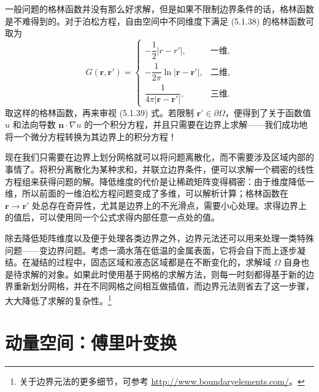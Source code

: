 一般问题的格林函数并没有那么好求解，但是如果不限制边界条件的话，格林函数是不难得到的。对于泊松方程，自由空间中不同维度下满足 (5.1.38) 的格林函数可取为
\begin{equation}
G(\bm r,\bm r')=
\begin{cases}
-\dfrac12|r-r'|,&\text{一维},\\[5pt]
-\dfrac1{2\pi}\ln|\bm r-\bm r'|,&\text{二维},\\[7pt]
\dfrac1{4\pi|\bm r-\bm r'|},&\text{三维}.
\end{cases}
\tag{5.1.40}
\end{equation}
取这样的格林函数，再来审视 (5.1.39) 式。若限制 $\bm r'\in\partial\Omega$，便得到了关于函数值 $u$ 和法向导数 $\bm n\cdot\nabla u$ 的一个积分方程，并且只需要在边界上求解——我们成功地将一个微分方程转换为其边界上的积分方程！

现在我们只需要在边界上划分网格就可以将问题离散化，而不需要涉及区域内部的事情了。将积分离散化为某种求和，并联立边界条件，便可以求解一个稠密的线性方程组来获得问题的解。降低维度的代价是让稀疏矩阵变得稠密：由于维度降低一维，所以前面的一维泊松方程问题变成了多维，可以解析计算；格林函数在 $\bm r\to\bm r'$ 处总存在奇异性，尤其是边界上的不光滑点，需要小心处理。求得边界上的值后，可以使用同一个公式求得内部任意一点处的值。

除去降低矩阵维度以及便于处理各类边界之外，边界元法还可以用来处理一类特殊问题——变边界问题。考虑一滴水落在低温的金属表面，它将会自下而上逐步凝结。在凝结的过程中，固态区域和液态区域都是在不断变化的，求解域 $\Omega$ 自身也是待求解的对象。如果此时使用基于网格的求解方法，则每一时刻都得基于新的边界重新划分网格，并在不同网格之间相互做插值，而边界元法则省去了这一步骤，大大降低了求解的复杂性。\footnote{关于边界元法的更多细节，可参考 \url{http://www.boundaryelements.com/}。}



\section{动量空间：傅里叶变换}

